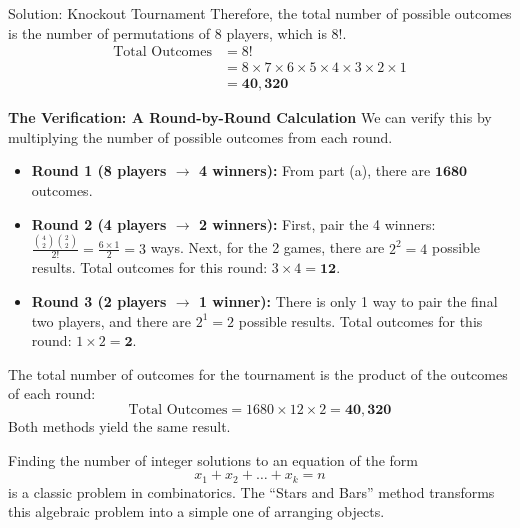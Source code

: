\begin{solutionboxbreak}{Solution: Knockout Tournament}
Therefore, the total number of possible outcomes is the number of permutations of 8 players, which is $8!$.
\begin{align*}
    \text{Total Outcomes} &= 8! \\
    &= 8 \times 7 \times 6 \times 5 \times 4 \times 3 \times 2 \times 1 \\
    &= \mathbf{40,320}
\end{align*}

\textbf{The Verification: A Round-by-Round Calculation}
We can verify this by multiplying the number of possible outcomes from each round.
\begin{itemize}
    \item \textbf{Round 1 (8 players $\to$ 4 winners):} From part (a), there are $\mathbf{1680}$ outcomes.
    
    \item \textbf{Round 2 (4 players $\to$ 2 winners):} 
    First, pair the 4 winners: $\frac{\binom{4}{2}\binom{2}{2}}{2!} = \frac{6 \times 1}{2} = 3$ ways.
    Next, for the 2 games, there are $2^2=4$ possible results.
    Total outcomes for this round: $3 \times 4 = \mathbf{12}$.
    
    \item \textbf{Round 3 (2 players $\to$ 1 winner):} 
    There is only 1 way to pair the final two players, and there are $2^1 = 2$ possible results.
    Total outcomes for this round: $1 \times 2 = \mathbf{2}$.
\end{itemize}
The total number of outcomes for the tournament is the product of the outcomes of each round:
\[
\text{Total Outcomes} = 1680 \times 12 \times 2 = \mathbf{40,320}
\]
Both methods yield the same result.
\end{solutionboxbreak}

\begin{exampleboxbreak}{}
    Finding the number of integer solutions to an equation of the form
\[
x_1 + x_2 + \dots + x_k = n
\]
is a classic problem in combinatorics. The ``Stars and Bars'' method transforms this algebraic problem into a simple one of arranging objects.
\end{exampleboxbreak}

